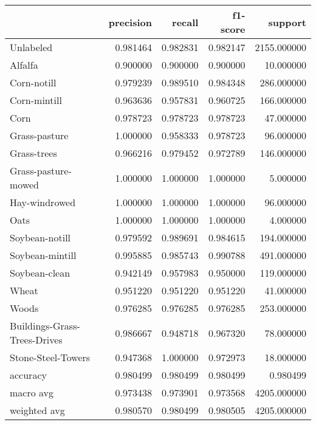 \begin{tabular}{lrrrr}
\toprule
{} &  precision &    recall &  f1-score &      support \\
\midrule
Unlabeled                    &   0.981464 &  0.982831 &  0.982147 &  2155.000000 \\
Alfalfa                      &   0.900000 &  0.900000 &  0.900000 &    10.000000 \\
Corn-notill                  &   0.979239 &  0.989510 &  0.984348 &   286.000000 \\
Corn-mintill                 &   0.963636 &  0.957831 &  0.960725 &   166.000000 \\
Corn                         &   0.978723 &  0.978723 &  0.978723 &    47.000000 \\
Grass-pasture                &   1.000000 &  0.958333 &  0.978723 &    96.000000 \\
Grass-trees                  &   0.966216 &  0.979452 &  0.972789 &   146.000000 \\
Grass-pasture-mowed          &   1.000000 &  1.000000 &  1.000000 &     5.000000 \\
Hay-windrowed                &   1.000000 &  1.000000 &  1.000000 &    96.000000 \\
Oats                         &   1.000000 &  1.000000 &  1.000000 &     4.000000 \\
Soybean-notill               &   0.979592 &  0.989691 &  0.984615 &   194.000000 \\
Soybean-mintill              &   0.995885 &  0.985743 &  0.990788 &   491.000000 \\
Soybean-clean                &   0.942149 &  0.957983 &  0.950000 &   119.000000 \\
Wheat                        &   0.951220 &  0.951220 &  0.951220 &    41.000000 \\
Woods                        &   0.976285 &  0.976285 &  0.976285 &   253.000000 \\
Buildings-Grass-Trees-Drives &   0.986667 &  0.948718 &  0.967320 &    78.000000 \\
Stone-Steel-Towers           &   0.947368 &  1.000000 &  0.972973 &    18.000000 \\
accuracy                     &   0.980499 &  0.980499 &  0.980499 &     0.980499 \\
macro avg                    &   0.973438 &  0.973901 &  0.973568 &  4205.000000 \\
weighted avg                 &   0.980570 &  0.980499 &  0.980505 &  4205.000000 \\
\bottomrule
\end{tabular}
